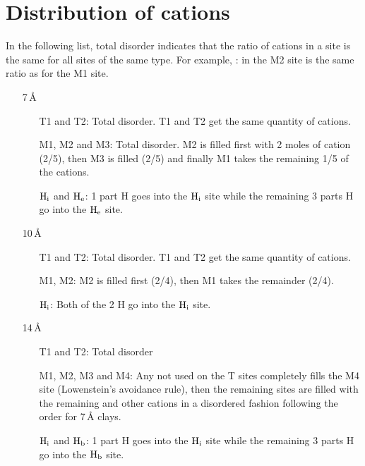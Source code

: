\documentclass[12pt]{article} %
\numberwithin{equation}{section}
\numberwithin{table}{section}
\numberwithin{figure}{section}
\begin{document}
\section{Distribution of cations}
\label{dist}
\noindent In the following list, total disorder indicates that the ratio of cations in a site is the same for all sites of the same type. For example, : in the M2 site is the same ratio as for the M1 site.

\begin{itemize}
\item[7\,\r{A}]
\begin{itemize}
\item[] T1 and T2:  Total disorder. T1 and T2 get the same quantity of cations.
\item[] M1, M2 and M3: Total disorder. M2 is filled first with 2 moles of cation (2/5), then M3 is filled (2/5) and finally M1 takes the remaining 1/5 of the cations.
\item[] $\rm H_i$ and $\rm H_e$: 1 part H goes into the $\rm H_i$ site while the remaining 3 parts H go into the $\rm H_e$ site. 
\end{itemize}

\item[10\,\r{A}]
\begin{itemize}
\item[] T1 and T2:  Total disorder. T1 and T2 get the same quantity of cations.
\item[] M1, M2:  M2 is filled first (2/4), then M1 takes the remainder (2/4).
\item[] $\rm H_i$: Both of the 2 H go into the $\rm H_i$ site.
\end{itemize}

\item[14\,\r{A}]
\begin{itemize}
\item[] T1 and T2:  Total disorder
\item[] M1, M2, M3 and M4: Any  not used on the T sites completely fills the M4 site (Lowenstein's avoidance rule), then the remaining sites are filled with the remaining  and other cations in a disordered fashion following the order for 7\,\r{A} clays.
\item[] $\rm H_i$ and $\rm H_b$: 1 part H goes into the $\rm H_i$ site while the remaining 3 parts H go into the $\rm H_b$ site. 
\end{itemize}

\end{itemize}
\end{document}
